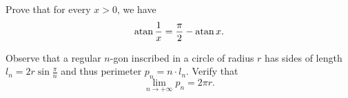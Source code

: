 \begin{exercise}
Prove that for every $x>0$, we have
\[
  \operatorname{atan} \frac 1 x = \frac \pi 2 - \operatorname{atan} x.
\]
\end{exercise}

\begin{exercise}
Observe that a regular $n$-gon inscribed in a circle of radius $r$ has sides of
length $l_n = 2r\sin \frac{\pi}{n}$ and thus perimeter $p_n = n\cdot l_n$.
Verify that
\[
  \lim_{n\to +\infty} p_n = 2\pi r.
\]
\end{exercise}